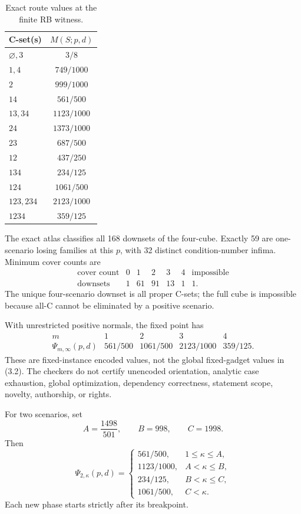 \documentclass[11pt]{article}
\theoremstyle{remark}
\begin{document}
\begin{table}[ht]
\centering
\caption{Exact route values at the finite RB witness.}
\label{tab:routes}
\begin{tabular}{@{}lc@{}}
\toprule
C-set(s) & $M(S;p,d)$\\
\midrule
$\varnothing,3$ & $3/8$\\
$1,4$ & $749/1000$\\
$2$ & $999/1000$\\
$14$ & $561/500$\\
$13,34$ & $1123/1000$\\
$24$ & $1373/1000$\\
$23$ & $687/500$\\
$12$ & $437/250$\\
$134$ & $234/125$\\
$124$ & $1061/500$\\
$123,234$ & $2123/1000$\\
$1234$ & $359/125$\\
\bottomrule
\end{tabular}
\end{table}

The exact atlas classifies all 168 downsets of the four-cube. Exactly 59 are
one-scenario losing families at this $p$, with 32 distinct condition-number
infima. Minimum cover counts are
\[
\begin{array}{c|rrrrrr}
\text{cover count}&0&1&2&3&4&\text{impossible}\\\hline
\text{downsets}&1&61&91&13&1&1.
\end{array}
\tag{4.2}
\]
The unique four-scenario downset is all proper C-sets; the full cube is
impossible because all-C cannot be eliminated by a positive scenario.

With unrestricted positive normals, the fixed point has
\[
\begin{array}{c|cccc}
m&1&2&3&4\\\hline
\Psi_{m,\infty}(p,d)&561/500&1061/500&2123/1000&359/125.
\end{array}
\tag{4.3}
\]
These are fixed-instance encoded values, not the global fixed-gadget values in
(3.2). The checkers do not certify unencoded orientation, analytic case
exhaustion, global optimization, dependency correctness, statement scope,
novelty, authorship, or rights.

For two scenarios, set
\[
A=\frac{1498}{501},\qquad B=998,\qquad C=1998.
\tag{4.4}
\]
Then
\[
\Psi_{2,\kappa}(p,d)=
\begin{cases}
561/500,&1\le\kappa\le A,\\
1123/1000,&A<\kappa\le B,\\
234/125,&B<\kappa\le C,\\
1061/500,&C<\kappa.
\end{cases}
\tag{4.5}
\]
Each new phase starts strictly after its breakpoint.
\end{document}
